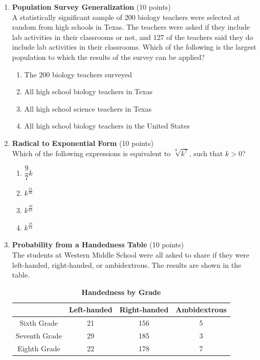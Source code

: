 \begin{enumerate}
  \item \textbf{Population Survey Generalization} (10 points)\\
  A statistically significant sample of 200 biology teachers were selected 
  at random from high schools in Texas. The teachers were asked if they 
  include lab activities in their classrooms or not, and 127 of the teachers 
  said they do include lab activities in their classrooms. Which of the 
  following is the largest population to which the results of the survey 
  can be applied?
  \begin{enumerate}[label=(\Alph*)]
    \item The 200 biology teachers surveyed
    \item All high school biology teachers in Texas
    \item All high school science teachers in Texas
    \item All high school biology teachers in the United States
  \end{enumerate}
  \begin{subanswer}
  \end{subanswer}







  \newpage

  \item \textbf{Radical to Exponential Form} (10 points)\\
  Which of the following expressions is equivalent to $\sqrt[9]{k^7}$, such that $k>0$?
  \begin{enumerate}[label=(\Alph*)]
    \item $\dfrac{9}{7}k$
    \item $k^{\frac{21}{36}}$
    \item $k^{\frac{49}{63}}$
    \item $k^{\frac{18}{14}}$
  \end{enumerate}
  \begin{subanswer}
  \end{subanswer}

  \item \textbf{Probability from a Handedness Table} (10 points)\\
  The students at Western Middle School were all asked to share if they were left-handed, right-handed, or ambidextrous. The results are shown in the table.
  \begin{table}[h!]
  \centering
  \renewcommand{\arraystretch}{1.3}
  \setlength{\tabcolsep}{12pt}
  \caption*{\textbf{Handedness by Grade}}
  \begin{tabular}{|c|c|c|c|}
  \hline
  \rowcolor[HTML]{E0E0E0}
  & Left-handed & Right-handed & Ambidextrous \\
  \hline Sixth Grade & 21 & 156 & 5 \\
  \hline Seventh Grade & 29 & 185 & 3 \\
  \hline Eighth Grade & 22 & 178 & 7 \\
  \hline
  \end{tabular}
  \end{table}


\end{enumerate}
